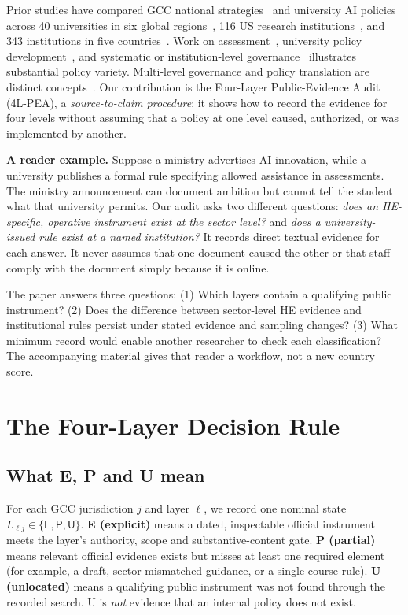 \documentclass[conference,letterpaper]{IEEEtran}
\newcommand{\stE}{\textsf{E}}
\newcommand{\stP}{\textsf{P}}
\newcommand{\stU}{\textsf{U}}
\begin{document}
Prior studies have compared GCC national strategies~\cite{albous} and university AI policies across 40 universities in six global regions~\cite{jin}, 116 US research institutions~\cite{mcdonald}, and 343 institutions in five countries~\cite{parker}. Work on assessment~\cite{moorhouse}, university policy development~\cite{li}, and systematic or institution-level governance~\cite{jiang,khoza,an,bacalso,qian} illustrates substantial policy variety. Multi-level governance and policy translation are distinct concepts~\cite{vukasovic,donina}. Our contribution is the Four-Layer Public-Evidence Audit (4L-PEA), a \emph{source-to-claim procedure}: it shows how to record the evidence for four levels without assuming that a policy at one level caused, authorized, or was implemented by another.

\textbf{A reader example.} Suppose a ministry advertises AI innovation, while a university publishes a formal rule specifying allowed assistance in assessments. The ministry announcement can document ambition but cannot tell the student what that university permits. Our audit asks two different questions: \emph{does an HE-specific, operative instrument exist at the sector level?} and \emph{does a university-issued rule exist at a named institution?} It records direct textual evidence for each answer. It never assumes that one document caused the other or that staff comply with the document simply because it is online.

The paper answers three questions: (1) Which layers contain a qualifying public instrument? (2) Does the difference between sector-level HE evidence and institutional rules persist under stated evidence and sampling changes? (3) What minimum record would enable another researcher to check each classification? The accompanying material gives that reader a workflow, not a new country score.

\section{The Four-Layer Decision Rule}
\subsection{What E, P and U mean}
For each GCC jurisdiction $j$ and layer $\ell$, we record one nominal state $L_{\ell j}\in\{\stE,\stP,\stU\}$. \textbf{E (explicit)} means a dated, inspectable official instrument meets the layer's authority, scope and substantive-content gate. \textbf{P (partial)} means relevant official evidence exists but misses at least one required element (for example, a draft, sector-mismatched guidance, or a single-course rule). \textbf{U (unlocated)} means a qualifying public instrument was not found through the recorded search. U is \emph{not} evidence that an internal policy does not exist.
\end{document}
